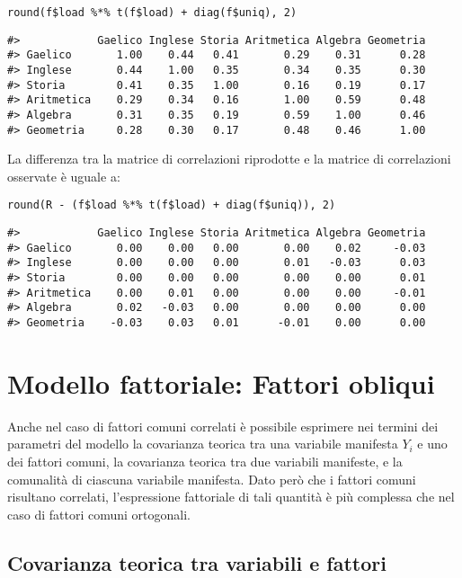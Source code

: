 \begin{exmp}
\begin{lstlisting}
round(f$load %*% t(f$load) + diag(f$uniq), 2)
\end{lstlisting}
{\small
\begin{lstlisting}
#>            Gaelico Inglese Storia Aritmetica Algebra Geometria
#> Gaelico       1.00    0.44   0.41       0.29    0.31      0.28
#> Inglese       0.44    1.00   0.35       0.34    0.35      0.30
#> Storia        0.41    0.35   1.00       0.16    0.19      0.17
#> Aritmetica    0.29    0.34   0.16       1.00    0.59      0.48
#> Algebra       0.31    0.35   0.19       0.59    1.00      0.46
#> Geometria     0.28    0.30   0.17       0.48    0.46      1.00
\end{lstlisting}
}
La differenza tra la matrice di correlazioni riprodotte e la matrice
di correlazioni osservate è uguale a:
\begin{lstlisting}
round(R - (f$load %*% t(f$load) + diag(f$uniq)), 2)
\end{lstlisting}
{\small
\begin{lstlisting}
#>            Gaelico Inglese Storia Aritmetica Algebra Geometria
#> Gaelico       0.00    0.00   0.00       0.00    0.02     -0.03
#> Inglese       0.00    0.00   0.00       0.01   -0.03      0.03
#> Storia        0.00    0.00   0.00       0.00    0.00      0.01
#> Aritmetica    0.00    0.01   0.00       0.00    0.00     -0.01
#> Algebra       0.02   -0.03   0.00       0.00    0.00      0.00
#> Geometria    -0.03    0.03   0.01      -0.01    0.00      0.00
\end{lstlisting}
}
\end{exmp}


\section{Modello fattoriale: Fattori obliqui}

Anche nel caso di fattori comuni correlati è possibile esprimere nei
termini dei parametri del modello la covarianza teorica tra una
variabile manifesta $Y_i$ e uno dei fattori comuni, la covarianza teorica tra due variabili manifeste, e la comunalità di ciascuna variabile manifesta. 
Dato però che i fattori comuni risultano correlati, l'espressione fattoriale di tali quantità è più complessa che nel caso di fattori comuni ortogonali.


\subsection{Covarianza teorica tra variabili e fattori}

